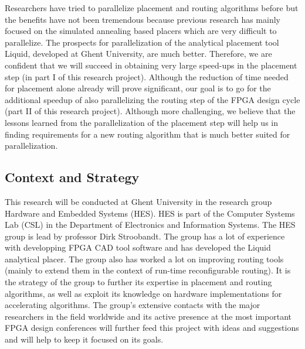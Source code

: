 \documentclass[a4paper,oneside,12pt]{article}
\begin{document}
Researchers have tried to parallelize placement and routing algorithms before but the benefits have not been tremendous because previous research has mainly focused on the simulated annealing based placers which are very difficult to parallelize. The prospects for parallelization of the analytical placement tool {\sc Liquid}, developed at Ghent University, are much better. Therefore, we are confident that we will succeed in obtaining very large speed-ups in the placement step (in part I of this research project). Although the reduction of time needed for placement alone already will prove significant, our goal is to go for the additional speedup of also parallelizing the routing step of the FPGA design cycle (part II of this research project). Although more challenging, we believe that the lessons learned from the parallelization of the placement step will help us in finding requirements for a new routing algorithm that is much better suited for parallelization. 

\subsection{Context and Strategy}\label{context}
This research will be conducted at Ghent University in the research group Hardware and Embedded Systems (HES). HES is part of the Computer Systems Lab (CSL) in the Department of Electronics and Information Systems. The HES group is lead by professor Dirk Stroobandt. The group has a lot of experience with developping FPGA CAD tool software and has developed the {\sc Liquid} analytical placer. The group also has worked a lot on improving routing tools (mainly to extend them in the context of run-time reconfigurable routing). It is the strategy of the group to further its expertise in placement and routing algorithms, as well as exploit its knowledge on hardware implementations for accelerating algorithms. The group's extensive contacts with the major researchers in the field worldwide and its active presence at the most important FPGA design conferences will further feed this project with ideas and suggestions and will help to keep it focused on its goals.



\newpage

\end{document}
